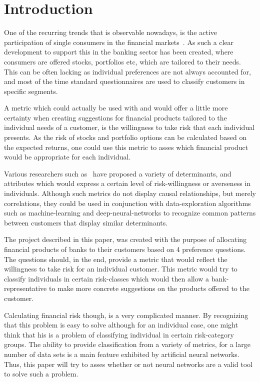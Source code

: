 \documentclass[12pt]{article}
\begin{document}
\section{Introduction}
\label{sec:Introduction}

One of the recurring trends that is observable nowadays, is the active participation of single consumers in the financial markets~\cite{barasinska}. As such a clear development to support this in the banking sector has been created, where consumers are offered stocks, portfolios etc, which are tailored to their needs. This can be often lacking as individual preferences are not always accounted for, and most of the time standard questionnaires are used to classify customers in specific segments.

A metric which could actually be used with and would offer a little more certainty when creating suggestions for financial products tailored to the individual needs of a customer, is the willingness to take risk that each individual presents. As the risk of stocks and portfolio options can be calculated based on the expected returns, one could use this metric to asses which financial product would be appropriate for each individual.

Various researchers such as~\cite{individualRiskAttitude} have proposed a variety of determinants, and attributes which would express a certain level of risk-willingness or averseness in individuals. Although such metrics do not display causal relationships, but merely correlations, they could be used in conjunction with data-exploration algorithms such as machine-learning and deep-neural-networks to recognize common patterns between customers that display similar determinants.

The project described in this paper, was created with the purpose of allocating financial products of banks to their customers based on 4 preference questions. The questions should, in the end, provide a metric that would reflect the willingness to take risk for an individual customer. This metric would try to classify individuals in certain risk-classes which would then allow a bank-representative to make more concrete suggestions on the products offered to the customer.

Calculating financial risk though, is a very complicated manner. By recognizing that this problem is easy to solve although for an individual case, one might think that his is a problem of classifying individual in certain risk-category groups. The ability to provide classification from a variety of metrics, for a large number of data sets is a main feature exhibited by artificial neural networks. Thus, this paper will try to asses whether or not neural networks are a valid tool to solve such a problem.
\end{document}
